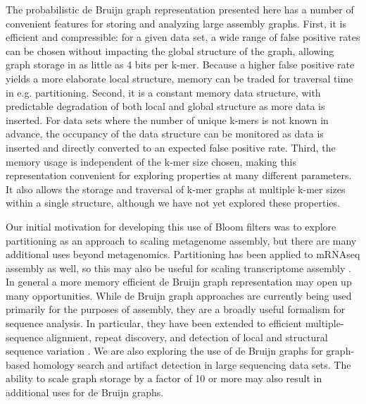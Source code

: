 \documentclass[12pt]{article} \usepackage{simplemargins}
\begin{document}
The probabilistic de Bruijn graph representation presented here has a
number of convenient features for storing and analyzing large assembly
graphs.  First, it is efficient and compressible: for a given data
set, a wide range of false positive rates can be chosen without
impacting the global structure of the graph, allowing graph storage in
as little as 4 bits per k-mer.  Because a higher false positive rate
yields a more elaborate local structure, memory can be traded for
traversal time in e.g. partitioning.  Second, it is a constant memory
data structure, with predictable degradation of both local and global
structure as more data is inserted.  For data sets where the number of
unique k-mers is not known in advance, the occupancy of the data
structure can be monitored as data is inserted and directly converted
to an expected false positive rate.  Third, the memory usage is
independent of the k-mer size chosen, making this representation
convenient for exploring properties at many different parameters.  It
also allows the storage and traversal of k-mer graphs at multiple
k-mer sizes within a single structure, although we have not yet
explored these properties.

Our initial motivation for developing this use of Bloom filters was to
explore partitioning as an approach to scaling metagenome assembly,
but there are many additional uses beyond metagenomics.  Partitioning
has been applied to mRNAseq assembly as well, so this may also be
useful for scaling transcriptome assembly \cite{trinity}.  In general
a more memory efficient de Bruijn graph representation may open up
many opportunities.  While de Bruijn graph approaches are currently
being used primarily for the purposes of assembly, they are a broadly
useful formalism for sequence analysis. In particular, they have been
extended to efficient multiple-sequence alignment\cite{zhang2003dna},
repeat discovery\cite{price2005novo}, and detection of local and
structural sequence variation \cite{zerbinothesis}.  We are also
exploring the use of de Bruijn graphs for graph-based homology search
and artifact detection in large sequencing data sets.  The ability to
scale graph storage by a factor of 10 or more may also result in
additional uses for de Bruijn graphs.

\end{document}
